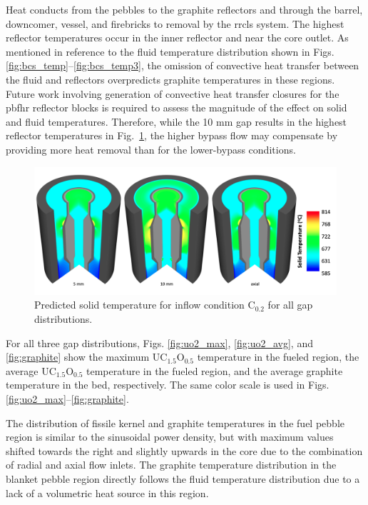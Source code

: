 Heat conducts from the pebbles to the graphite reflectors and through the barrel, downcomer, vessel, and firebricks to removal by the \gls{rrcls} system. The highest reflector temperatures occur in the inner reflector and near the core outlet. As mentioned in reference to the fluid temperature distribution shown in Figs. \ref{fig:bcs_temp}--\ref{fig:bcs_temp3}, the omission of convective heat transfer between the fluid and reflectors overpredicts graphite temperatures in these regions. 
Future work involving generation of convective heat transfer closures for the \gls{pbfhr} reflector blocks is required to assess the magnitude of the effect on solid and fluid temperatures. Therefore, while the 10 \si{\milli\meter} gap results in the highest reflector temperatures in Fig.\ \ref{fig:solid_noncore}, the higher bypass flow may compensate by providing more heat removal than for the lower-bypass conditions.

\begin{figure}[h!]
\centering
\includegraphics[height=0.4\linewidth]{figs/solid_temp_noncore.png}
\caption{Predicted solid temperature for inflow condition C$_\text{0.2}$ for all gap distributions.}
\label{fig:solid_noncore}
\end{figure}

For all three gap distributions, Figs. \ref{fig:uo2_max}, \ref{fig:uo2_avg}, and \ref{fig:graphite} show the maximum UC$_{1.5}$O$_{0.5}$ temperature in the fueled region, the average UC$_{1.5}$O$_{0.5}$ temperature in the fueled region, and the average graphite temperature in the bed, respectively. The same color scale is used in Figs. \ref{fig:uo2_max}--\ref{fig:graphite}.

The distribution of fissile kernel and graphite temperatures in the fuel pebble region is similar to the sinusoidal power density, but with maximum values shifted towards the right and slightly upwards in the core due to the combination of radial and axial flow inlets. The graphite temperature distribution in the blanket pebble region directly follows the fluid temperature distribution due to a lack of a volumetric heat source in this region.

